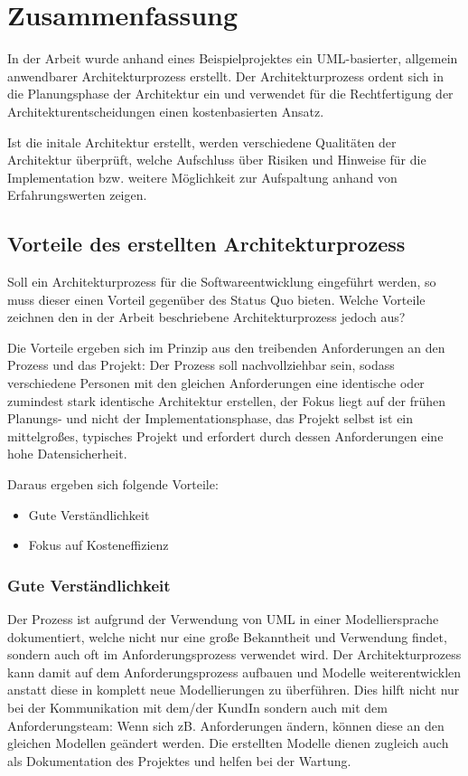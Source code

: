 \chapter{Zusammenfassung}
In der Arbeit wurde anhand eines Beispielprojektes ein UML-basierter, allgemein anwendbarer Architekturprozess erstellt. Der Architekturprozess ordent sich in die Planungsphase der Architektur ein und verwendet für die Rechtfertigung der Architekturentscheidungen einen kostenbasierten Ansatz.

Ist die initale Architektur erstellt, werden verschiedene Qualitäten der Architektur überprüft, welche Aufschluss über Risiken und Hinweise für die Implementation bzw. weitere Möglichkeit zur Aufspaltung anhand von Erfahrungswerten zeigen.


\section{Vorteile des erstellten Architekturprozess}
Soll ein Architekturprozess für die Softwareentwicklung eingeführt werden, so muss dieser einen Vorteil gegenüber des Status Quo bieten. Welche Vorteile zeichnen den in der Arbeit beschriebene Architekturprozess jedoch aus?

Die Vorteile ergeben sich im Prinzip aus den treibenden Anforderungen an den Prozess und das Projekt: Der Prozess soll nachvollziehbar sein, sodass verschiedene Personen mit den gleichen Anforderungen eine identische oder zumindest stark identische Architektur erstellen, der Fokus liegt auf der frühen Planungs- und nicht der Implementationsphase, das Projekt selbst ist ein mittelgroßes, typisches Projekt und erfordert durch dessen Anforderungen eine hohe Datensicherheit.

Daraus ergeben sich folgende Vorteile:

\begin{itemize}
  \item Gute Verständlichkeit
  \item Fokus auf Kosteneffizienz
\end{itemize}

\subsection{Gute Verständlichkeit}
Der Prozess ist aufgrund der Verwendung von UML in einer Modelliersprache dokumentiert, welche nicht nur eine große Bekanntheit und Verwendung findet, sondern auch oft im Anforderungsprozess verwendet wird. Der Architekturprozess kann damit auf dem Anforderungsprozess aufbauen und Modelle weiterentwicklen anstatt diese in komplett neue Modellierungen zu überführen. Dies hilft nicht nur bei der Kommunikation mit dem/der KundIn sondern auch mit dem Anforderungsteam: Wenn sich zB. Anforderungen ändern, können diese an den gleichen Modellen geändert werden. Die erstellten Modelle dienen zugleich auch als Dokumentation des Projektes und helfen bei der Wartung.

